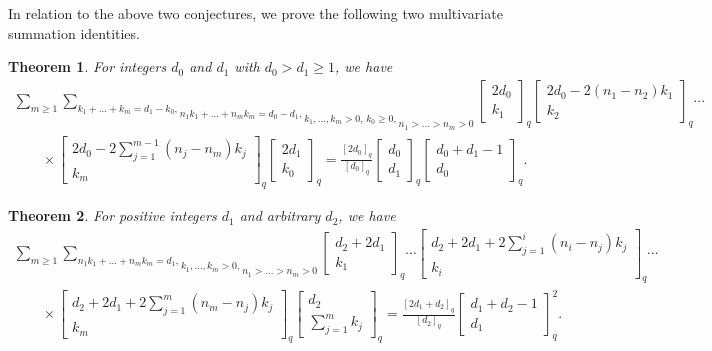 \documentclass[pdftex]{sigma}
\newtheorem{Theorem}{Theorem}
\begin{document}
In relation to the above two conjectures, we prove the following
two multivariate summation identities.

\begin{Theorem} \label{TA}
For integers $d_0$ and $d_1$ with $d_0>d_1\ge1$, we have
\begin{gather}
\sum_{m\ge1}
\underset{n_1>\dots>n_m>0}
{
\underset{k_1,\dots,k_m>0,\,k_0\ge0,}
{
\underset{n_1k_1+\dots+n_mk_m=d_0-d_1,}
{\sum_{k_1+\dots+k_m=d_1-k_0,}}}}
\begin{bmatrix} 2d_0\\k_1\end{bmatrix}_q
\begin{bmatrix} 2d_0-2(n_1-n_2)k_1\\k_2\end{bmatrix}_q\cdots\nonumber\\
\qquad{}\times
\begin{bmatrix} 2d_0-2\sum_{j=1}^{m-1}(n_j-n_m)k_j\\k_m\end{bmatrix}_q
\begin{bmatrix} 2d_1\\k_0\end{bmatrix}_q
=\frac {[2d_0]_q} {[d_0]_q}
\begin{bmatrix} d_0\\d_1\end{bmatrix}_q
\begin{bmatrix} d_0+d_1-1\\d_0\end{bmatrix}_q.
\label{AF}
\end{gather}
\end{Theorem}

\begin{Theorem} \label{TB}
For positive integers $d_1$ and arbitrary $d_2$, we have
\begin{gather}
\sum_{m\ge1}
\underset{n_1>\dots>n_m>0}
{
\underset{k_1,\dots,k_m>0,}
{\sum_{n_1k_1+\dots+n_mk_m=d_1,}}}
\begin{bmatrix} d_2+2d_1\\k_1\end{bmatrix}_q
\cdots
\begin{bmatrix} d_2+2d_1+2\sum_{j=1}^{i}(n_{i}-n_{j})k_{j}\\k_{i}\end{bmatrix}_q \cdots\nonumber\\
\qquad{}\times
\begin{bmatrix} d_2+2d_1+2\sum_{j=1}^{m}(n_{m}-n_{j})k_{j}\\k_{m}\end{bmatrix}_q
\begin{bmatrix} d_2\\\sum_{j=1}^mk_{j}\end{bmatrix}_q
\!=
\frac {[2d_1+d_2]_q} {[d_2]_q}\begin{bmatrix} d_1+d_2-1\\d_1\end{bmatrix}_q^2.
\label{AG}
\end{gather}
\end{Theorem}
\end{document}
